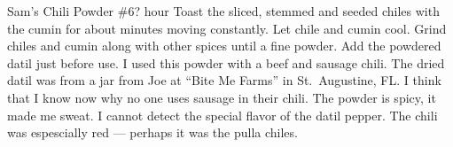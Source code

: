 \begin{recipe}{Sam's Chili Powder \#6}{?}{ hour}
Toast the sliced, stemmed and seeded chiles with the cumin for about \unit[3--4]{minutes} moving constantly.  Let chile and cumin cool.
Grind chiles and cumin along with other spices until a fine powder.
Add the powdered datil just before use.
\freeform I used this powder with a beef and sausage chili.  The dried datil was from a jar from Joe at ``Bite Me Farms'' in St.\ Augustine, FL.  I think that I know now why no one uses sausage in their chili.  The powder is spicy, it made me sweat.  I cannot detect the special flavor of the datil pepper.  The chili was espescially red --- perhaps it was the pulla chiles.
\end{recipe}

